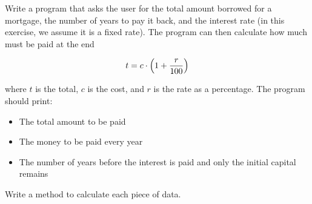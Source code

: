 \documentclass{article}
\begin{document}
Write a program that asks the user for the total amount borrowed for a
mortgage, the number of years to pay it back, and the interest rate
(in this exercise, we assume it is a fixed 
rate). The program can then calculate how much must be paid at the end

$$t = c \cdot \left(1+ {r \over 100}\right)$$

where $t$ is the total, $c$ is the cost,
and $r$ is the rate as a percentage. The program should print: 

\begin{itemize}
\item The total amount to be paid
\item The money to be paid every year
\item The number of years before the interest is paid and only the
  initial capital remains
\end{itemize}

Write a method to calculate each piece of data. 

%






\end{document}
